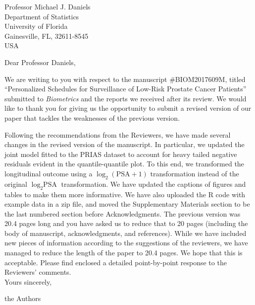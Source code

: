 \documentclass[a4paper, 11pt]{letter}
\begin{document}
\begin{letter}{Professor Michael J. Daniels\\
Department of Statistics\\
University of Florida\\
Gainesville, FL, 32611-8545\\
USA}

\address{Department of Biostatistics\\
Erasmus University Medical Center\\PO Box 2040, 3000 CA Rotterdam\\ the Netherlands
}

\opening{Dear Professor Daniels,}

We are writing to you with respect to the manuscript \#BIOM2017609M, titled ``Personalized Schedules for Surveillance of Low-Risk Prostate Cancer Patients'' submitted to \emph{Biometrics} and the reports we received after its review. We would like to thank you for giving us the opportunity to submit a revised version of our paper that tackles the weaknesses of the previous version.

Following the recommendations from the Reviewers, we have made several changes in the revised version of the manuscript. In particular, we updated the joint model fitted to the PRIAS dataset to account for heavy tailed negative residuals evident in the quantile-quantile plot. To this end, we transformed the longitudinal outcome using a $\log_2(\mbox{PSA}+1)$ transformation instead of the original $\log_2{\mbox{PSA}}$ transformation. We have updated the captions of figures and tables to make them more informative. We have also uploaded the R code with example data in a zip file, and moved the Supplementary Materials section to be the last numbered section before Acknowledgments.  The previous version was 20.4 pages long and you have asked us to reduce that to 20 pages (including the body of manuscript, acknowledgments, and references). While we have included new pieces of information according to the suggestions of the reviewers,  we have managed to reduce the length of the paper to 20.4 pages. We hope that this is acceptable. Please find enclosed a detailed point-by-point response to the Reviewers' comments.\\

Yours sincerely,

the Authors



\end{letter}
\end{document}
